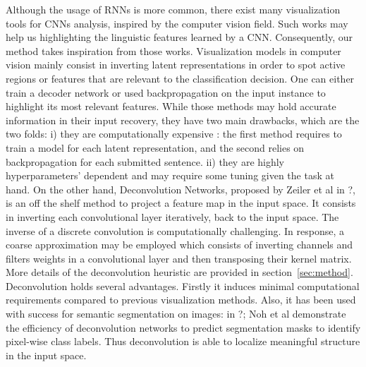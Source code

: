 Although the usage of RNNs is more common, there exist many visualization tools for CNNs analysis, 
inspired by the computer vision field. Such works may help us highlighting the linguistic features learned by a 
CNN. Consequently, our method takes inspiration from those works. Visualization models in computer vision mainly consist 
in inverting latent representations in order to spot active regions or features that are relevant to the classification decision.
One can either train a decoder network or used backpropagation on the input instance to highlight its most relevant features. 
While those methods may hold accurate information in their input recovery, they have two main drawbacks, which are the two folds: 
i) they are computationally expensive : the first method requires to train a model for each latent representation, and the second relies 
on backpropagation for each submitted sentence. ii) they are highly hyperparameters’ dependent and may require some tuning given the task at hand.
On the other hand, Deconvolution Networks, proposed by Zeiler et al in ?, is an off the shelf method to project a feature map in the input 
space. It consists in inverting each convolutional layer iteratively, back to the input space. The inverse of a discrete convolution is 
computationally challenging. In response, a coarse approximation may be employed which consists of inverting channels and filters weights 
in a convolutional layer and then transposing their kernel matrix. More details of the deconvolution heuristic are provided in section~\ref{sec:method}.
Deconvolution holds several advantages. Firstly it induces minimal computational requirements compared to previous visualization methods. 
Also, it has been used with success for semantic segmentation on images: in ?; Noh et al demonstrate the efficiency of deconvolution networks 
to predict segmentation masks to identify pixel-wise class labels. Thus deconvolution is able to localize meaningful structure in the input space.
